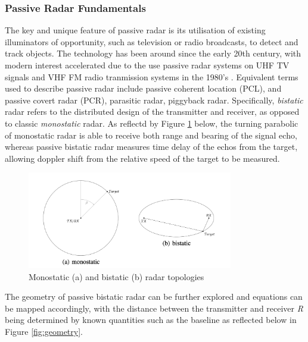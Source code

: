 \documentclass[12pt,a4paper]{article}
\begin{document}
\subsubsection{Passive Radar Fundamentals}
The key and unique feature of passive radar is its utilisation of existing illuminators of opportunity, such as television or radio broadcasts, to detect and track objects. The technology has been around since the early 20th century, with modern interest accelerated due to the use passive radar systems on UHF TV signals and VHF FM radio tranmission systems in the 1980's \cite{FundamentalsPassiveRadar}. Equivalent terms used to describe passive radar include passive coherent location (PCL), and passive covert radar (PCR), parasitic radar, piggyback radar. Specifically, \textit{bistatic} radar refers to the distributed design of the transmitter and receiver, as opposed to classic \textit{monostatic} radar. As reflectd by Figure \ref{fig: topology} below, the turning parabolic of monostatic radar is able to receive both range and bearing of the signal echo, whereas passive bistatic radar measures time delay of the echos from the target, allowing doppler shift from the relative speed of the target to be measured.
\begin{figure}[htbp]
    \centering
    \includegraphics[width=0.8\textwidth]{monoBi.jpg}
    \caption{Monostatic (a) and bistatic (b) radar topologies \cite{IOTpassiveRadar}}
    \label{fig: topology}
\end{figure}
\par 
\vspace{0.5cm} 
\noindent The geometry of passive bistatic radar can be further explored and equations can be mapped accordingly, with the distance between the transmitter and receiver \textit{R} being determined by known quantities such as the baseline as reflected below in Figure \ref{fig:geometry}.
\end{document}
